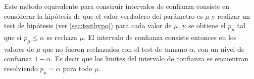 






Este método equivalente para construir intervalos de confianza consiste en
considerar la hipótesis de que el valor verdadero del parámetro es $\mu$ y
realizar un test de hipótesis (ver \cref{sec:testhypo}) para cada valor de
$\mu$, y se obtiene el {\pvalue} $p_\mu$ tal que si  $p_\mu \leq \alpha$
se rechaza $\mu$. El intervalo de confianza consiste entonces en los valores
de $\mu$ que no fueron rechazados con el test de tamano $\alpha$, con un
nivel de confianza $1-\alpha$. Es decir que los limites del intervalo de
confianza se encuentran resolviendo $p_\mu = \alpha$ para todo $\mu$.


